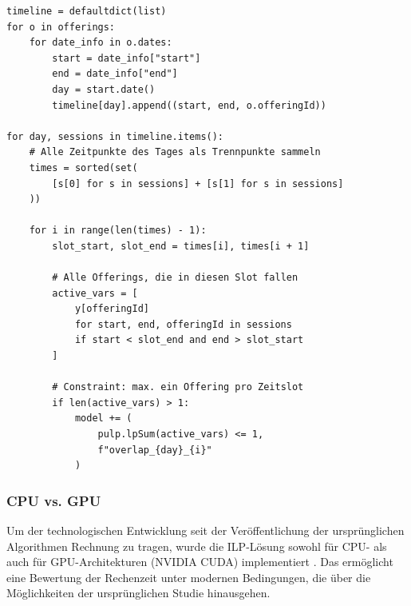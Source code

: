 \newpage


\begin{lstlisting}[caption={Zeitliche Überschneidungen},
                   label={lst:overlap}]
timeline = defaultdict(list)
for o in offerings:
    for date_info in o.dates:
        start = date_info["start"]
        end = date_info["end"]
        day = start.date()
        timeline[day].append((start, end, o.offeringId))

for day, sessions in timeline.items():
    # Alle Zeitpunkte des Tages als Trennpunkte sammeln
    times = sorted(set(
        [s[0] for s in sessions] + [s[1] for s in sessions]
    ))
    
    for i in range(len(times) - 1):
        slot_start, slot_end = times[i], times[i + 1]
    
        # Alle Offerings, die in diesen Slot fallen
        active_vars = [
            y[offeringId]
            for start, end, offeringId in sessions
            if start < slot_end and end > slot_start
        ]
    
        # Constraint: max. ein Offering pro Zeitslot
        if len(active_vars) > 1:
            model += (
                pulp.lpSum(active_vars) <= 1,
                f"overlap_{day}_{i}"
            )
\end{lstlisting}



\subsubsection{CPU vs. GPU}

Um der technologischen Entwicklung seit der Veröffentlichung der ursprünglichen Algorithmen Rechnung zu tragen, wurde die ILP-Lösung sowohl für CPU- als auch für GPU-Architekturen (NVIDIA CUDA) implementiert \cite{gh-repo}. Das ermöglicht eine Bewertung der Rechenzeit unter modernen Bedingungen, die über die Möglichkeiten der ursprünglichen Studie hinausgehen.